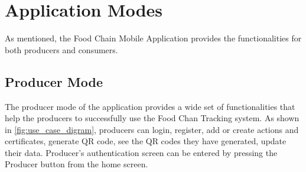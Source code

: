 \section{Application Modes}

As mentioned, the Food Chain Mobile Application provides the functionalities for both producers and consumers. 

\subsection{Producer Mode}

The producer mode of the application provides a wide set of functionalities that help the producers to successfully use the Food Chan Tracking system. As shown in \ref{fig:use_case_digram}, producers can login, register, add or create actions and certificates, generate QR code, see the QR codes they have generated, update their data. 
Producer's authentication screen can be entered by pressing the Producer button from the home screen. 

